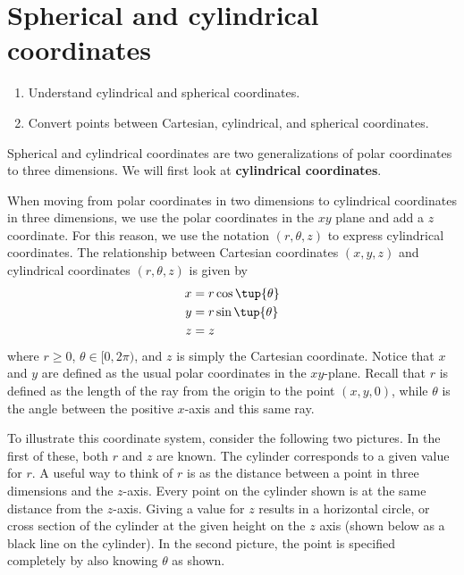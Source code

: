 \section{Spherical and cylindrical coordinates}

\begin{outcome}
  \begin{enumerate}
  \item Understand cylindrical and spherical coordinates.
  \item Convert points between Cartesian, cylindrical, and spherical
    coordinates.
  \end{enumerate}
\end{outcome}

Spherical and cylindrical coordinates are two generalizations of polar coordinates to three dimensions. We will first look at \textbf{cylindrical coordinates}.

When moving from polar coordinates in two dimensions to cylindrical coordinates in three dimensions, we use the polar coordinates in the $xy$
plane and add a $z$ coordinate. For this reason, we use the notation $(r, \theta, z)$ to express cylindrical coordinates.
The relationship between Cartesian coordinates $(x,y,z)$ and cylindrical coordinates $(r, \theta, z)$ is given by  
\begin{align*}
x& =r\cos \tup{\theta }  \\
y& =r\sin \tup{\theta }  \\
z& =z
\end{align*}
where $r\geq 0$, $\theta \in \lbrack 0,2\pi )$, and $z$ is simply the Cartesian
coordinate. Notice that $x$ and $y$ are defined as the usual polar coordinates in the $xy$-plane. Recall that $r$ is defined as the length of the ray from the origin to the point $(x,y,0)$, while $\theta$ is the angle between the positive $x$-axis and this same ray. 

To illustrate this coordinate system, consider the following two pictures.
In the first of these, both $r$ and $z$ are known. The cylinder corresponds to a given value for $r$. A useful way to think of $r$ is
as the distance between a point in three dimensions and the $z$-axis. Every point on the cylinder shown is at the same distance from the $z$-axis. Giving a value for $z$ results in a horizontal circle, or cross section of the cylinder at the given height on the $z$ axis (shown below as a black line on the cylinder). In the second picture, the point is specified completely by also knowing $\theta$ as shown.

